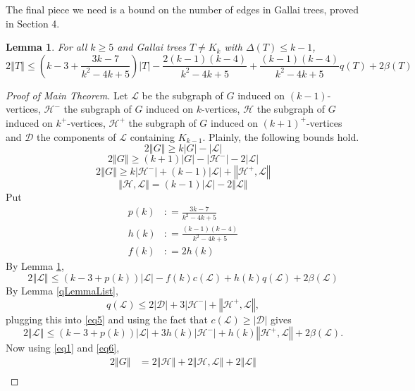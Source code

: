 \documentclass[10pt]{article}
\theoremstyle{plain}
\newtheorem{lem}[thm]{Lemma}
\theoremstyle{definition}
\theoremstyle{remark}
\newcommand{\fancy}[1]{\mathcal{#1}}
\newcommand{\D}{\fancy{D}}
\renewcommand{\L}{\fancy{L}}
\newcommand{\HH}{\fancy{H}}
\newcommand{\card}[1]{\left|#1\right|}
\newcommand{\size}[1]{\left\Vert#1\right\Vert}
\newcommand{\parens}[1]{\left( #1 \right)}
\newcommand{\DefinedAs}{\mathrel{\mathop:}=}
\def\D{\fancy{D}}
\begin{document}
The final piece we need is a bound on the number of edges in Gallai trees, proved in Section 4.
\begin{lem}\label{GallaiTreeBound}
For all $k \ge 5$ and Gallai trees $T \ne K_k$ with $\Delta(T) \le k - 1$,
\[2\size{T} \le \parens{k-3 + \frac{3k-7}{k^2-4k+5}}\card{T} - \frac{2(k-1)(k-4)}{k^2-4k+5} + \frac{(k-1)(k-4)}{k^2-4k+5}q(T) + 2\beta(T)\]
\end{lem}
\bigskip
\begin{proof}[Proof of Main Theorem]
Let $\L$ be the subgraph of $G$ induced on $(k-1)$-vertices, $\HH^-$ the subgraph of $G$ induced on $k$-vertices, $\HH$ the subgraph of $G$ induced on $k^+$-vertices, $\HH^+$ the subgraph of $G$ induced on $(k+1)^+$-vertices and $\D$ the components of $\L$ containing $K_{k-1}$.
Plainly, the following bounds hold.
\begin{equation}\label{eq1}
2\size{G} \ge k\card{G} - \card{\L}
\end{equation}
\begin{equation}\label{eq2}
2\size{G} \ge (k+1)\card{G} - \card{\HH^-} - 2\card{\L}
\end{equation}
\begin{equation}\label{eq3}
2\size{G} \ge k\card{\HH^-} + (k-1)\card{\L} + \size{\HH^+, \L}
\end{equation}
\begin{equation}\label{eq4}
\size{\HH,\L} = (k-1)\card{\L} - 2\size{\L}
\end{equation}
Put
\begin{align*}
p(k) &\DefinedAs \frac{3k-7}{k^2-4k+5}\\
h(k) &\DefinedAs \frac{(k-1)(k-4)}{k^2-4k+5}\\
f(k) &\DefinedAs 2h(k)
\end{align*}
By Lemma \ref{GallaiTreeBound},
\begin{equation}\label{eq5}
2\size{\L} \le \parens{k-3 + p(k)}\card{\L} - f(k)c(\L) + h(k)q(\L) + 2\beta(\L)
\end{equation}
By Lemma \ref{qLemmaList},
\[q(\L) \le 2\card{\D} + 3\card{\HH^-} + \size{\HH^+, \L},\]
plugging this into \eqref{eq5} and using the fact that $c(\L) \ge \card{\D}$ gives
\begin{equation}\label{eq6}
2\size{\L} \le \parens{k-3 + p(k)}\card{\L} + 3h(k)\card{\HH^-} + h(k)\size{\HH^+, \L} + 2\beta(\L).
\end{equation}
Now using \eqref{eq1} and \eqref{eq6},
\begin{align*}
	2\size{G} &= 2\size{\HH} + 2\size{\HH, \L} + 2\size{\L}\\

\end{align*}
\end{proof}
\end{document}
